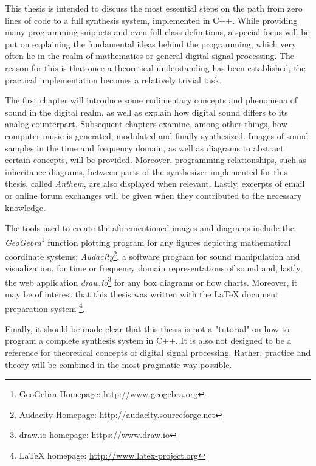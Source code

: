 \pagebreak

This thesis is intended to discuss the most essential steps on the path from zero lines of code to a full synthesis system, implemented in C++. While providing many programming snippets and even full class definitions\footnotemark{}, a special focus will be put on explaining the fundamental ideas behind the programming, which very often lie in the realm of mathematics or general digital signal processing. The reason for this is that once a theoretical understanding has been established, the practical implementation becomes a relatively trivial task.\vspace{\baselineskip}


The first chapter will introduce some rudimentary concepts and phenomena of sound in the digital realm, as well as explain how digital sound differs to its analog counterpart. Subsequent chapters examine, among other things, how computer music is generated, modulated and finally synthesized. Images of sound samples in the time and frequency domain, as well as diagrams to abstract certain concepts, will be provided. Moreover, programming relationships, such as inheritance diagrams, between parts of the synthesizer implemented for this thesis, called \emph{Anthem}, are also displayed when relevant. Lastly, excerpts of email or online forum exchanges will be given when they contributed to the necessary knowledge. \vspace{\baselineskip}

The tools used to create the aforementioned images and diagrams include the \emph{GeoGebra}\footnote{GeoGebra Homepage: \url{http://www.geogebra.org}} function plotting program for any figures depicting mathematical coordinate systems; \emph{Audacity}\footnote{Audacity Homepage: \url{http://audacity.sourceforge.net}}, a software program for sound manipulation and visualization, for time or frequency domain representations of sound and, lastly, the web application \emph{draw.io}\footnote{draw.io homepage: \url{https://www.draw.io}} for any box diagrams or flow charts. Moreover, it may be of interest that this thesis was written with the \LaTeX{} document preparation system \footnote{\LaTeX{} homepage: \url{http://www.latex-project.org}}. \vspace{\baselineskip}

Finally, it should be made clear that this thesis is not a "tutorial" on how to program a complete synthesis system in C++. It is also not designed to be a reference for theoretical concepts of digital signal processing. Rather, practice and theory will be combined in the most pragmatic way possible.
